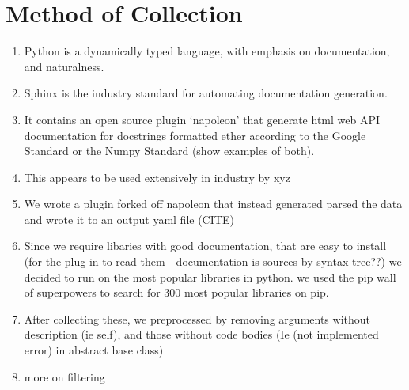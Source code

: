 
\section{Method of Collection} %
\label{sec:method_of_collection}

\begin{enumerate}
    \item Python is a dynamically typed language, with emphasis on documentation, and naturalness.
    \item Sphinx is the industry standard for automating documentation generation.
    \item It contains an open source plugin `napoleon' that generate html web API documentation for docstrings formatted ether according to the Google Standard or the Numpy Standard (show examples of both).
    \item This appears to be used extensively in industry by xyz
    \item We wrote a plugin forked off napoleon that instead generated parsed the data and wrote it to an output yaml file (CITE)
    \item Since we require libaries with good documentation, that are easy to install (for the plug in to read them - documentation is sources by syntax tree??) we decided to run on the most popular libraries in python. we used the pip wall of superpowers to search for 300 most popular libraries on pip.
    \item After collecting these, we preprocessed by removing arguments without description (ie self), and those without code bodies (Ie (not implemented error) in abstract base class)
    \item more on filtering
\end{enumerate}




